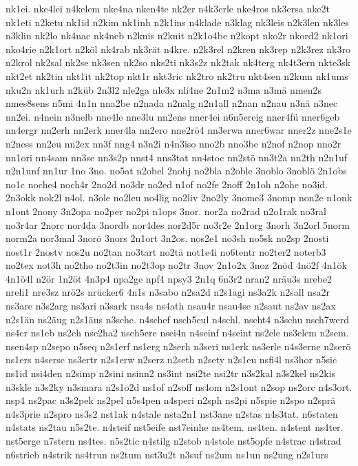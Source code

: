 {nk1ei.
nke4lei
n4kelem
nke4na
nken4te
nk2er
n4k3erle
nke4ros
nk3ersa
nke2t
nk1eti
n2ketu
nk1id
n2kim
nk1inh
n2k1ins
n4klade
n3klag
nk3leis
n2k3len
nk3les
n3klin
nk2lo
nk4nac
nk4neb
n2knis
n2knit
n2k1o4be
n2kopt
nko2r
nkord2
nk1ori
nko4rie
n2k1ort
n2köl
nk4rab
nk3rät
n4kre.
n2k3rel
n2kren
nk3rep
n2k3rez
nk3ro
n2krol
nk2sal
nk2se
nk3sen
nk2so
nks2ti
nk3s2z
nk2tak
nk4terg
nk4t3ern
nkte3sk
nkt2et
nk2tin
nkt1it
nk2top
nkt1r
nkt3ric
nk2tro
nk2tru
nkt4sen
n2kum
nk1ums
nku2n
nk1urh
n2küb
2n3l2
nle2ga
nle3x
nli4ne
2n1m2
n3ma
n3mä
nmen2s
nmes8sens
n5mi
4n1n
nna2be
n2nada
n2nalg
n2n1all
n2nan
n2nau
n3nä
n3nec
nn2ei.
n4nein
n3nelb
nne4le
nne3lu
nn2ens
nner4ei
n6n5ereig
nner4fü
nner6geb
nn4ergr
nn2erh
nn2erk
nner4la
nn2ero
nne2rö4
nn3erwa
nner6war
nner2z
nne2s1e
n2ness
nn2eu
nn2ex
nn3f
nng4
n3n2i
n4n3iso
nno2b
nno3be
n2nof
n2nop
nno2r
nn1ori
nn4sam
nn3se
nn3s2p
nnst4
nns3tat
nn4stoc
nn2stö
nn3t2a
nn2th
n2n1uf
n2n1unf
nn1ur
1no
3no.
no5at
n2obel
2nobj
no2bla
n2oble
3noblo
3noblö
2n1obs
no1c
noche4
noch4r
2no2d
no3dr
no2ed
n1of
no2fe
2noff
2n1oh
n2ohe
no3id.
2n3okk
nok2l
n4ol.
n3ole
no2leu
no4lig
no2liv
2no2ly
3nome3
3nomp
non2e
n1onk
n1ont
2nony
3n2opa
no2per
no2pi
n1ops
3nor.
nor2a
no2rad
n2o1rak
no3ral
no3r4ar
2norc
nor4da
3nordb
nor4des
nor2d5r
no3r2e
2n1org
3norh
3n2orl
5norm
norm2a
nor3mal
3norö
3nors
2n1ort
3n2os.
nos2e1
no3sh
no5sk
no2sp
2nosti
nost1r
2nostv
nos2u
no2tan
no3tart
no2tä
not1e4i
no6tentr
no2ter2
noterb3
no2tex
not3h
no2tho
no2t3in
no2t3op
no2tr
3nov
2n1o2x
3noz
2nöd
4nö2f
4n1ök
4n1ö4l
n2ör
1n2öt
4n3p4
npa2ge
npf4
npsy3
2n1q
6n3r2
nran2
nräu3s
nrebe2
nreli1
nre3sz
nrö2s
nrücker6
4n1s
n3sabo
n2sa2d
n2s1agi
ns3a2k
n2sall
nsa2r
ns3are
n3s2arg
ns3ari
n3sark
nsa4s
ns4ath
nsau4r
nsau4se
n2saut
ns2av
ns2ax
n2s1än
ns2äug
n2s1äus
n3sche.
n4schef
nsch5eul
n4schl.
nscht4
n3schu
nsch7werd
ns4cr
ns1eb
ns2eh
nse2ha2
nseh5ere
nsei4n
n4seinf
n4seint
ns2ele
ns3elem
n2sem.
nsen4sp
n2sepo
n5seq
n2s1erf
ns1erg
n2serh
n3seri
ns1erk
ns3erle
n4s3erne
n2serö
ns1ers
n4sersc
ns3ertr
n2s1erw
n2serz
n2seth
n2sety
n2s1eu
nsfi4l
ns3hor
n5sic
ns1id
nsi4den
n2simp
n2sini
nsinn2
ns3int
nsi2te
nsi2tr
n3s2kal
n3s2kel
ns2kis
n3skle
n3s2ky
n3smara
n2s1o2d
ns1of
n2soff
ns4om
n2s1ont
n2sop
ns2orc
n4s3ort.
nsp4
ns2pac
n3s2pek
ns2pel
n5s4pen
n4speri
n2sph
ns2pi
n5spie
n2spo
n2sprä
n4s3prie
n2spro
ns3s2
nst1ak
n4stale
nsta2n1
nst3ane
n2stas
n4s3tat.
n6staten
n4stats
ns2tau
n5s2te.
n4steif
nst5eife
nst7einhe
ns4tem.
ns4ten.
n4stent
ns4ter.
nst5erge
n7stern
ns4tes.
n5s2tic
n4stilg
n2stob
n4stole
nst5opfe
n4strac
n4strad
n6strieb
n4strik
ns4trun
ns2tum
nst3u2t
n3suf
ns2um
ns1un
ns2ung
n2s1urs
}
